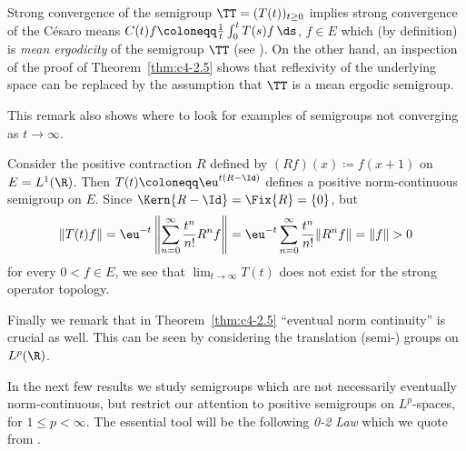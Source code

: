 Strong convergence of the semigroup $\TT = (T(t))_{t \geq 0}$ implies strong convergence of the Césaro means $C(t)f \coloneqq  \frac{1}{t}\int_{0}^{t} T(s)f \, \ds$, $f \in E$ which (by definition) is \emph{mean ergodicity} of the semigroup $\TT$ (see \textcite[Chap.5.1]{davies:1980}).
On the other hand, an inspection of the proof of Theorem~\ref{thm:c4-2.5} shows that reflexivity of the underlying space can be replaced by the assumption that $\TT$ is a mean ergodic semigroup.

This remark also shows where to look for examples of semigroups not converging as $t \to \infty$.

Consider the positive contraction $R$ defined by $(Rf)(x) \coloneqq f(x+1)$ on $E = L^{1}(\R)$.
Then $T(t) \coloneqq \eu^{t(R-\Id)}$ defines a positive norm-continuous semigroup on $E$.
Since $\Kern{R - \Id} = \Fix{R} = \{0\}$, but 
\[
\|T(t)f\| = \eu^{-t} \left\|\sum_{n=0}^{\infty} \frac{t^n}{n!}R^{n}f\right\| = 
\eu^{-t}\sum_{n=0}^{\infty} \frac{t^n}{n!}\|R^{n}f\|= \|f\| > 0
\] 
for every $0 < f \in E$, we see that $\lim_{t\to\infty} T(t)$ does not exist for the strong operator topology.

Finally we remark that in Theorem~\ref{thm:c4-2.5} \enquote{eventual norm continuity} is crucial as well.
This can be seen by considering the translation (semi-) groups on $L^{p}(\R)$.

In the next few results we study semigroups which are not necessarily eventually norm-continuous, but restrict our attention to positive semigroups on $L^{p}$-spaces, for $1 \leq p < \infty$.
The essential tool will be the following \emph{0-2 Law} which we quote from \textcite[Theorem~3.7]{greiner:1982}.

